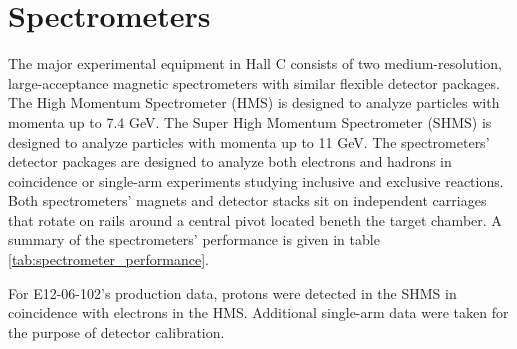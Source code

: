\section{Spectrometers}
The major experimental equipment in Hall C consists of two medium-resolution,
large-acceptance magnetic spectrometers with similar flexible detector
packages.
The High Momentum Spectrometer (HMS) is designed to analyze particles with
momenta up to 7.4 GeV.
The Super High Momentum Spectrometer (SHMS) is designed to analyze particles
with momenta up to 11 GeV.
The spectrometers' detector packages are designed to analyze both electrons
and hadrons in coincidence or single-arm experiments studying inclusive and
exclusive reactions.
Both spectrometers' magnets and detector stacks sit on independent carriages
that rotate on rails around a central pivot located beneth the target chamber.
A summary of the spectrometers' performance is given in table
\ref{tab:spectrometer_performance}.


For E12-06-102's production data, protons were detected in the SHMS in
coincidence with electrons in the HMS.
Additional single-arm data were taken for the purpose of detector calibration.

